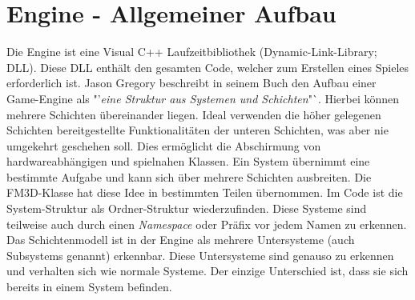 \section{Engine - Allgemeiner Aufbau}

Die Engine ist eine Visual C++ Laufzeitbibliothek (Dynamic-Link-Library; DLL). Diese DLL enthält den gesamten Code, welcher zum Erstellen eines Spieles erforderlich ist. Jason Gregory beschreibt in seinem Buch den Aufbau einer Game-Engine als "'\textit{eine Struktur aus Systemen und Schichten}"`. 
Hierbei können mehrere Schichten übereinander liegen. Ideal verwenden die höher gelegenen Schichten bereitgestellte Funktionalitäten der unteren Schichten, was aber nie umgekehrt geschehen soll. Dies ermöglicht die Abschirmung von hardwareabhängigen und spielnahen Klassen. Ein System übernimmt eine bestimmte Aufgabe und kann sich über mehrere Schichten ausbreiten. \cite{gea}
Die FM3D-Klasse hat diese Idee in bestimmten Teilen übernommen. Im Code ist die System-Struktur als Ordner-Struktur wiederzufinden. Diese Systeme sind teilweise auch durch einen \textit{Namespace} oder Präfix vor jedem Namen zu erkennen. Das Schichtenmodell ist in der Engine als mehrere Untersysteme (auch Subsystems genannt) erkennbar.
 Diese Untersysteme sind genauso zu erkennen und verhalten sich wie normale Systeme. Der einzige Unterschied ist, dass sie sich bereits in einem System befinden.